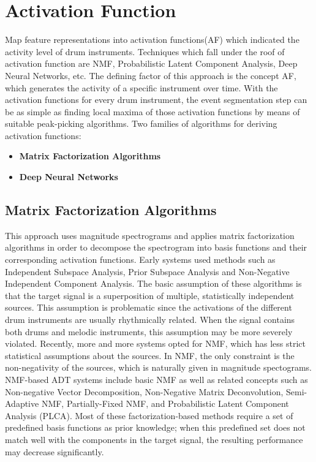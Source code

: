 \section*{Activation Function}
Map feature representations into activation functions(AF) which indicated the activity level of drum instruments. Techniques which fall under the roof of activation function are NMF, Probabilistic Latent Component Analysis, Deep Neural Networks, etc.
The defining factor of this approach is the concept AF, which generates the activity of a specific instrument over time. With the activation functions for every drum instrument, the event segmentation step can be as simple as finding local maxima of those activation functions by means of suitable peak-picking algorithms. Two families of algorithms for deriving activation functions:
\begin{itemize}
\item \textbf{Matrix Factorization Algorithms}
\item \textbf{Deep Neural Networks}
\end{itemize}

\subsection*{Matrix Factorization Algorithms}

This approach uses magnitude spectrograms and applies matrix factorization algorithms in order to decompose the spectrogram into basis functions and their corresponding activation functions. Early systems used methods such as Independent Subspace Analysis, Prior Subspace Analysis and Non-Negative Independent Component Analysis. The basic assumption of these algorithms is that the target signal is a superposition of multiple, statistically independent sources. This assumption is problematic since the activations of the different drum instruments are usually rhythmically related. When the signal contains both drums and melodic instruments, this assumption may be more severely violated. Recently, more and more systems opted for NMF, which has less strict statistical assumptions about the sources. In NMF, the only constraint is the non-negativity of the sources, which is naturally given in magnitude spectograms. NMF-based ADT systems include basic NMF as well as related concepts such as Non-negative Vector Decomposition, Non-Negative Matrix Deconvolution, Semi-Adaptive NMF, Partially-Fixed NMF, and Probabilistic Latent Component Analysis (PLCA). Most of these factorization-based methods require a set of predefined basis functions as prior knowledge; when this predefined set does not match well with the components in the target signal, the resulting performance may decrease significantly.



